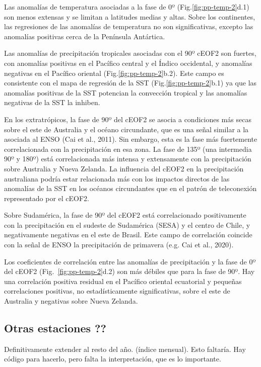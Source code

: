 \documentclass[12pt,oneside]{reedthesis}
\begin{document}
Las anomalías de temperatura asociadas a la fase de 0º (Fig.\ref{fig:pp-temp-2}d.1) son menos extensas y se limitan a latitudes medias y altas.
Sobre los continentes, las regresiones de las anomalías de temperatura no son significativas, excepto las anomalías positivas cerca de la Península Antártica.

Las anomalías de precipitación tropicales asociadas con el 90º cEOF2 son fuertes, con anomalías positivas en el Pacífico central y el Índico occidental, y anomalías negativas en el Pacífico oriental (Fig.\ref{fig:pp-temp-2}b.2).
Este campo es consistente con el mapa de regresión de la SST (Fig.\ref{fig:pp-temp-2}b.1) ya que las anomalías positivas de la SST potencian la convección tropical y las anomalías negativas de la SST la inhiben.

En los extratrópicos, la fase de 90º del cEOF2 se asocia a condiciones más secas sobre el este de Australia y el océano circundante, que es una señal similar a la asociada al ENSO (Cai et al., 2011).
Sin embargo, esta es la fase más fuertemente correlacionada con la precipitación en esa zona.
La fase de 135º (una intermedia 90º y 180º) está correlacionada más intensa y extensamente con la precipitación sobre Australia y Nueva Zelanda.
La influencia del cEOF2 en la precipitación australiana podría estar relacionada más con los impactos directos de las anomalías de la SST en los océanos circundantes que en el patrón de teleconexión representado por el cEOF2.

Sobre Sudamérica, la fase de 90º del cEOF2 está correlacionado positivamente con la precipitación en el sudeste de Sudamérica (SESA) y el centro de Chile, y negativamente negativas en el este de Brasil.
Este campo de correlación coincide con la señal de ENSO la precipitación de primavera (e.g. Cai et al., 2020).

Los coeficientes de correlación entre las anomalías de precipitación y la fase de 0º del cEOF2 (Fig.~\ref{fig:pp-temp-2}d.2) son más débiles que para la fase de 90º.
Hay una correlación positiva residual en el Pacífico oriental ecuatorial y pequeñas correlaciones positivas, no estadísticamente significativas, sobre el este de Australia y negativas sobre Nueva Zelanda.

\hypertarget{otras-estaciones}{%
\subsection{Otras estaciones ??}\label{otras-estaciones}}

Definitivamente extender al resto del año.
(índice mensual).
Esto faltaría.
Hay código para hacerlo, pero falta la interpretación, que es lo importante.
\end{document}
